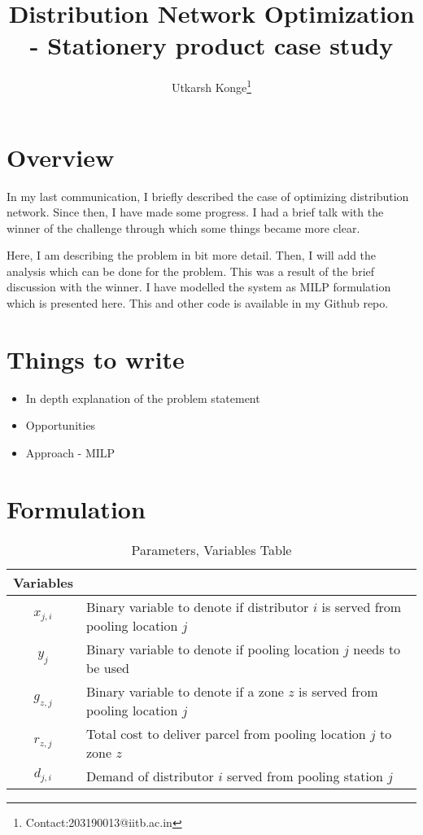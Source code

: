 \documentclass[11pt]{article}
\begin{document}
 
 
\title{Distribution Network Optimization - Stationery product case study }
\author{Utkarsh Konge\footnote{Contact:203190013@iitb.ac.in}}
\date{}
\maketitle

\section{Overview}
In my last communication, I briefly described the case of optimizing distribution network. Since then, I have made some progress. I had a brief talk with the winner of the challenge through which some things became more clear. 

Here, I am describing the problem in bit more detail. Then, I will add the analysis which can be done for the problem. This was a result of the brief discussion with the winner. I have modelled the system as MILP formulation which is presented here. This and other code is available in my Github repo. 

\section{Things to write}
\begin{itemize}
	\item In depth explanation of the problem statement
	\item Opportunities
	\item Approach - MILP
\end{itemize}

\section{Formulation}

\begin{table}
	\centering
	\begin{tabular}{cl}
		\toprule
		Variables & \\
		\midrule
		$x_{j,i}$ & Binary variable to denote if distributor $i$ is served from pooling location $j$\\
		$y_j$ & Binary variable to denote if pooling location $j$ needs to be used\\
		$g_{z,j}$ & Binary variable to denote if a zone $z$ is served from pooling location $j$\\
		$r_{z,j}$ & Total cost to deliver parcel from pooling location $j$ to zone $z$ \\
		$d_{j,i}$ & Demand of distributor $i$ served from pooling station $j$\\
		\bottomrule	
	\end{tabular}
	\caption{Parameters, Variables Table}
	\label{Tab:ParamSetVar}
\end{table}

%
%
\end{document}
